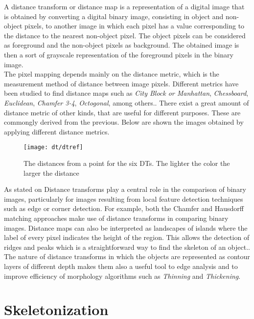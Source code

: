 A distance transform or distance map is a representation of a digital image
that is obtained by converting a digital binary image, consisting in object
and non-object pixels, to another image in which each pixel has a value
corresponding to the distance to the nearest non-object pixel. The object 
pixels can be considered as foreground and the non-object pixels as
background. The obtained image is then a sort of grayscale representation
of the foreground pixels in the binary image.\\
The pixel mapping depends mainly on the distance metric, which is the 
measurement method of distance between image pixels. Different metrics have been 
studied  to find distance maps such as 
\emph{City Block or Manhattan},
\emph{Chessboard}, \emph{Euclidean}, \emph{Chamfer 3-4}, \emph{Octogonal}, among
others.\cite[p.363]{dtresearch}. There exist a great amount of
distance metric of other kinds, that are useful for different purposes.
These are commongly derived from the previous.
Below are shown the images obtained by applying different distance metrics.

\begin{figure}[h t b p ! H]
 \centering
   \texttt{[image: dt/dtref]}
 \caption{The distances from a point for the six DTs.
 The lighter the color the larger the distance \cite[p.365]{dtresearch}}
\end{figure}

As stated on \cite{dtresearch2} 
Distance transforms play a central role in the comparison of binary images, 
particularly for images resulting from local feature detection techniques such 
as edge or corner detection. For example, both the Chamfer
and Hausdorff matching approaches make use of distance transforms in comparing binary images. 
Distance maps can also be interpreted as landscapes of islands 
where the label of every pixel indicates the height of the region. This allows
the detection of ridges and peaks which is a straightforward way to find the
skeleton of an object.\cite[237]{ridgedt}. The nature of distance transforms
in which the objects are represented as contour layers of different depth
makes them also a useful tool to edge analysis and to improve efficiency of 
morphology algorithms such as \emph{Thinning} and \emph{Thickening}.\\

\section{Skeletonization}
\label{sec:skeletonization}


